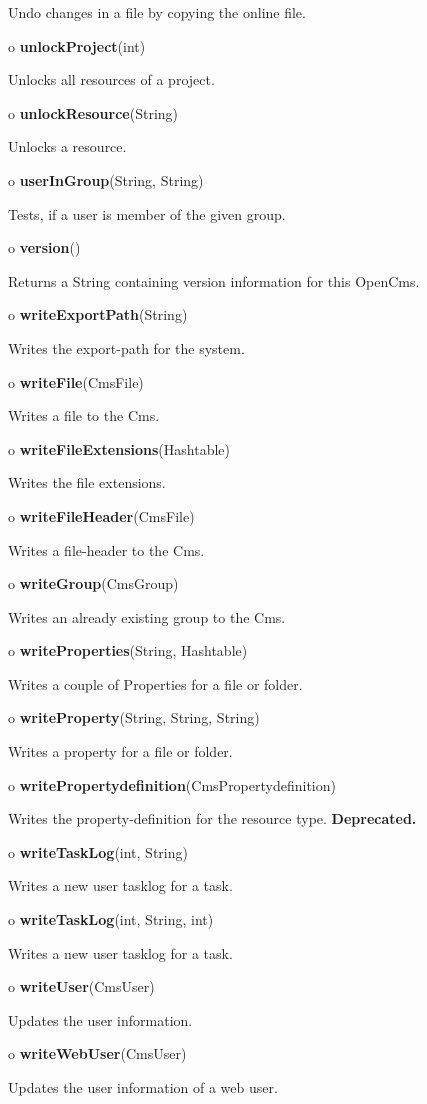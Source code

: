 \begin{description}
Undo changes in a file by copying the online file.
\item o {\bf unlockProject}(int)

Unlocks all resources of a project.
\item o {\bf unlockResource}(String)

Unlocks a resource.
\item o {\bf userInGroup}(String, String)

Tests, if a user is member of the given group.
\item o {\bf version}()

Returns a String containing version information for this OpenCms.
\item o {\bf writeExportPath}(String)

Writes the export-path for the system.
\item o {\bf writeFile}(CmsFile)

Writes a file to the Cms.
\item o {\bf writeFileExtensions}(Hashtable)

Writes the file extensions.
\item o {\bf writeFileHeader}(CmsFile)

Writes a file-header to the Cms.
\item o {\bf writeGroup}(CmsGroup)

Writes an already existing group to the Cms.
\item o {\bf writeProperties}(String, Hashtable)

Writes a couple of Properties for a file or folder.
\item o {\bf writeProperty}(String, String, String)

Writes a property for a file or folder.
\item o {\bf writePropertydefinition}(CmsPropertydefinition)

Writes the property-definition for the resource type. {\bf Deprecated.}
\item o {\bf writeTaskLog}(int, String)

Writes a new user tasklog for a task.
\item o {\bf writeTaskLog}(int, String, int)

Writes a new user tasklog for a task.
\item o {\bf writeUser}(CmsUser)

Updates the user information.
\item o {\bf writeWebUser}(CmsUser)

Updates the user information of a web user.
\end{description}

